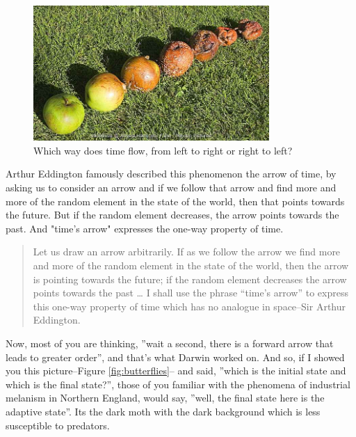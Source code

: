 \documentclass[]{article}
\begin{document}
\begin{figure}[H]
	\begin{center}
		\caption{Which way does time flow, from left to right or right to left?}\label{fig:apples}
		\includegraphics[width=0.8\textwidth]{apples}
	\end{center}
\end{figure}
Arthur Eddington famously described this phenomenon
the arrow of time, by asking us to consider
an arrow and if we follow that arrow and
find more and more of the random element
in the state of the world, then that
points towards the future. But if the
random element decreases, the arrow points
towards the past. And "time's arrow"
expresses the one-way property of time.
\begin{quotation}
	Let us draw an arrow arbitrarily. If as we follow the arrow we find more and more
	of the random element in the state of the world, then the arrow is pointing towards
	the future; if the random element decreases the arrow points towards the past … I
	shall use the phrase “time's arrow” to express this one-way property of time which
	has no analogue in space--Sir Arthur Eddington.
\end{quotation}
Now, most of you are thinking, ''wait a second,
there is a forward arrow that leads
to greater order'', and that's what Darwin
worked on. And so, if I showed you this picture--Figure \ref{fig:butterflies}--
and said, ''which is the initial state and
which is the final state?'', those of you
familiar with the phenomena of industrial melanism
in Northern England, would say, ''well, the final
state here is the adaptive state''. Its the dark
moth with the dark background which is less susceptible to predators.
\end{document}
